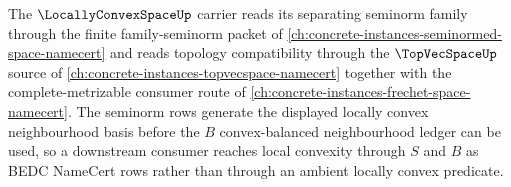 The $\LocallyConvexSpaceUp$ carrier reads its separating seminorm family through the finite family-seminorm packet of \autoref{ch:concrete-instances-seminormed-space-namecert} and reads topology compatibility through the $\TopVecSpaceUp$ source of \autoref{ch:concrete-instances-topvecspace-namecert} together with the complete-metrizable consumer route of \autoref{ch:concrete-instances-frechet-space-namecert}. The seminorm rows generate the displayed locally convex neighbourhood basis before the $B$ convex-balanced neighbourhood ledger can be used, so a downstream consumer reaches local convexity through $S$ and $B$ as BEDC NameCert rows rather than through an ambient locally convex predicate.

